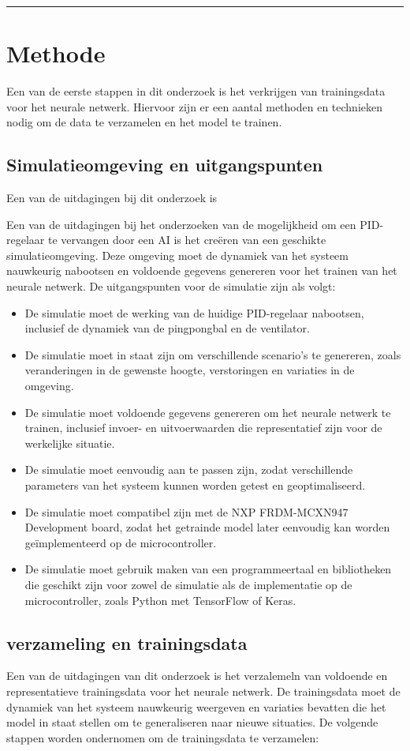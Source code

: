 \vspace{0.2cm}
{\color{gray}\hrule}
\section{Methode}
Een van de eerste stappen in dit onderzoek is het verkrijgen van trainingsdata voor het neurale netwerk. Hiervoor zijn er een aantal methoden en technieken nodig om de data te verzamelen en het model te trainen.


\subsection{Simulatieomgeving en uitgangspunten}
Een van de uitdagingen bij dit onderzoek is 




Een van de uitdagingen bij het onderzoeken van de mogelijkheid om een PID-regelaar te vervangen door een AI is het creëren van een geschikte simulatieomgeving. Deze omgeving moet de dynamiek van het systeem nauwkeurig nabootsen en voldoende gegevens genereren voor het trainen van het neurale netwerk. De uitgangspunten voor de simulatie zijn als volgt:
\begin{itemize}
  \item De simulatie moet de werking van de huidige PID-regelaar nabootsen, inclusief de dynamiek van de pingpongbal en de ventilator.
  \item De simulatie moet in staat zijn om verschillende scenario's te genereren, zoals veranderingen in de gewenste hoogte, verstoringen en variaties in de omgeving.
  \item De simulatie moet voldoende gegevens genereren om het neurale netwerk te trainen, inclusief invoer- en uitvoerwaarden die representatief zijn voor de werkelijke situatie. 
  \item De simulatie moet eenvoudig aan te passen zijn, zodat verschillende parameters van het systeem kunnen worden getest en geoptimaliseerd.
  \item De simulatie moet compatibel zijn met de NXP FRDM-MCXN947 Development board, zodat het getrainde model later eenvoudig kan worden geïmplementeerd op de microcontroller.
  \item De simulatie moet gebruik maken van een programmeertaal en bibliotheken die geschikt zijn voor zowel de simulatie als de implementatie op de microcontroller, zoals Python met TensorFlow of Keras.
\end{itemize}

\subsection{verzameling en trainingsdata}
Een van de uitdagingen van dit onderzoek is het verzalemeln van voldoende en representatieve trainingsdata voor het neurale netwerk. De trainingsdata moet de dynamiek van het systeem nauwkeurig weergeven en variaties bevatten die het model in staat stellen om te generaliseren naar nieuwe situaties. De volgende stappen worden ondernomen om de trainingsdata te verzamelen:

